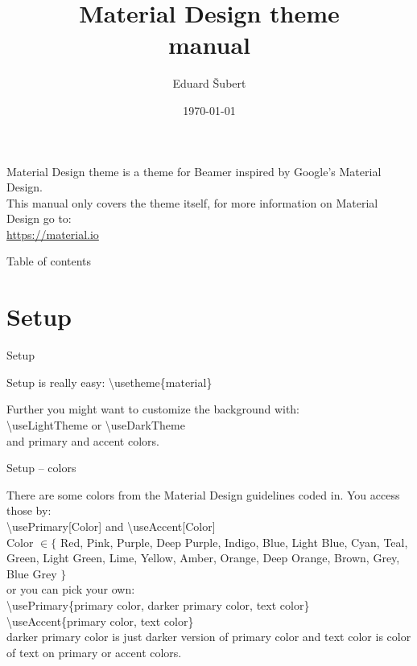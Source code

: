 \documentclass[aspectratio=43]{beamer}
\title{Material Design theme \\manual}
\date{\today}
\author[Šubert]{Eduard Šubert}
\begin{document}
\begin{frame}
\titlepage
\end{frame}

\begin{frame}
\begin{card}
Material Design theme is a theme for Beamer inspired by Google's Material Design. \\[5mm]
This manual only covers the theme itself, for more information on Material Design go to: 
\\\url{https://material.io}
\end{card}
\end{frame}

\begin{frame}{Table of contents}
\begin{card}
\tableofcontents
\end{card}
\end{frame}

\section{Setup}
\begin{frame}{Setup}
\begin{card}
Setup is really easy: 
{\color{primary}\textbackslash usetheme\{material\}}
\end{card}
\begin{card}
Further you might want to customize the background with: \\[2mm]
{\color{primary}\textbackslash useLightTheme} or {\color{primary}\textbackslash useDarkTheme} \\[2mm]
and primary and accent colors.
\end{card}
\end{frame}

\begin{frame}{Setup -- colors}
\begin{card}
There are some colors from the Material Design guidelines coded in. You access those by: \\[2mm]
{\color{primary} \textbackslash usePrimary[Color]} and {\color{primary}\textbackslash useAccent[Color]}\\[2mm]
{\tiny {\color{primary}Color} $\in \{$ Red, Pink, Purple, Deep Purple, Indigo, Blue, Light Blue, Cyan, Teal, Green, Light Green, Lime, Yellow, Amber, Orange, Deep Orange, Brown, Grey, Blue Grey $\}$} \\[2mm]
or you can pick your own:\\[2mm]
{\color{primary} \textbackslash usePrimary\{primary color, darker primary color, text color\}}
{\color{primary} \textbackslash useAccent\{primary color, text color\}}\\[2mm]
{\color{primary} darker primary color} is just darker version of {\color{primary} primary color} and {\color{primary} text color} is color of text on {\color{primary} primary} or {\color{primary} accent colors}.
\end{card}
\end{frame}
\end{document}

